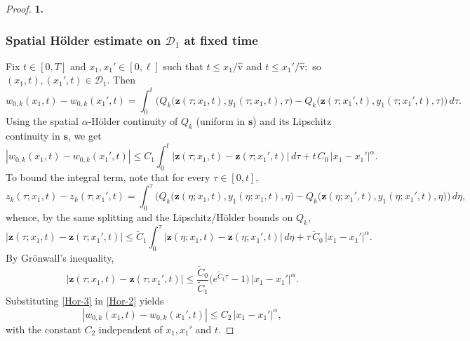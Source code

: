 \documentclass[reqno]{amsart}            %
\numberwithin{equation}{section}
\begin{document}
\begin{proof} {\bf 1.}
		
		\subsubsection*{Spatial Hölder estimate on $\mathcal{D}_1$ at fixed time}
		Fix $t\in[0,T]$ and $x_1,x_1'\in[0,\ell]$ such that $t\le x_1/\hat{\mathrm{v}}$ and $t\le x_1'/\hat{\mathrm{v}};$ so $(x_1,t),(x_1',t)\in\mathcal{D}_1$. Then
		\[
		w_{0,k}(x_1,t)- w_{0,k}(x_1',t)=\int_0^t \Big(Q_k\big(\mathbf{z}(\tau;x_1,t),y_1(\tau;x_1,t),\tau\big) - Q_k\big(\mathbf{z}(\tau;x_1',t),y_1(\tau;x_1',t),\tau\big)\Big)\,d\tau.
		\]
		Using the spatial $\alpha$-Hölder continuity of $Q_k$ (uniform in $\mathbf{s}$) and its Lipschitz continuity in $\mathbf{s}$, we get
		\begin{equation}\label{Hor-2}
			|w_{0,k}(x_1,t)- w_{0,k}(x_1',t)|\le C_1 \int_0^t |\mathbf{z}(\tau;x_1,t)- \mathbf{z}(\tau;x_1',t)|\,d\tau + t\,C_0\,|x_1-x_1'|^\alpha.
		\end{equation}
		To bound the integral term, note that for every $\tau\in[0,t]$,
		\[
		z_k(\tau;x_1,t)-z_k(\tau;x_1',t)
		=\int_0^\tau \Big(Q_k\big(\mathbf{z}(\eta;x_1,t),y_1(\eta;x_1,t),\eta\big)
		- Q_k\big(\mathbf{z}(\eta;x_1',t),y_1(\eta;x_1',t),\eta\big)\Big)\,d\eta,
		\]
		whence, by the same splitting and the Lipschitz/Hölder bounds on $Q_k$,
		$$
		|\mathbf{z}(\tau;x_1,t)- \mathbf{z}(\tau;x_1',t)| \le \tilde{C}_1 \int_0^\tau |\mathbf{z}(\eta;x_1,t)- \mathbf{z}(\eta;x_1',t)|\,d\eta + \tau\, \tilde{C}_0\,|x_1-x_1'|^\alpha.
		$$
		By Grönwall’s inequality,
		\begin{equation}\label{Hor-3}
			|\mathbf{z}(\tau;x_1,t)- \mathbf{z}(\tau;x_1',t)| 
			\le \frac{\tilde{C}_0}{\tilde{C}_1}\big(e^{\tilde{C}_1 \tau}-1\big)\,|x_1-x_1'|^\alpha .
		\end{equation}
		Substituting \eqref{Hor-3} in \eqref{Hor-2} yields  
		$$
		|w_{0,k}(x_1,t)- w_{0,k}(x_1',t)|\le C_2 \, |x_1-x_1'|^\alpha,
		$$
		with the constant $C_2$ independent of $x_1,x_1'$ and $t$.
		

\end{proof}
\end{document}
